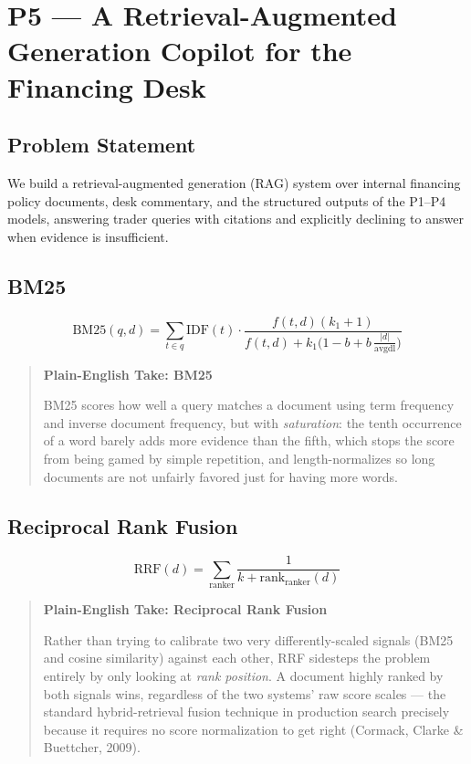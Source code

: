 \documentclass[11pt]{report}
\newenvironment{feynman}[1]{%
  \begin{quote}\small\color{black}
  \colorbox{feynman}{\parbox{0.97\linewidth}{\vspace{2pt}\textbf{\color{navy}Plain-English Take: #1}\\[2pt]
}}
}{\end{quote}}
\begin{document}
\chapter{P5 --- A Retrieval-Augmented Generation Copilot for the Financing Desk}

\section{Problem Statement}
We build a retrieval-augmented generation (RAG) system over internal financing policy documents, desk
commentary, and the structured outputs of the P1--P4 models, answering trader queries with citations
and explicitly declining to answer when evidence is insufficient.

\section{BM25}
\begin{equation}
\text{BM25}(q,d) = \sum_{t\in q} \text{IDF}(t)\cdot\frac{f(t,d)(k_1+1)}{f(t,d) + k_1\big(1-b+b\,\tfrac{|d|}{\text{avgdl}}\big)}
\end{equation}
\begin{feynman}{BM25}
BM25 scores how well a query matches a document using term frequency and inverse document frequency,
but with \emph{saturation}: the tenth occurrence of a word barely adds more evidence than the fifth,
which stops the score from being gamed by simple repetition, and length-normalizes so long documents
are not unfairly favored just for having more words.
\end{feynman}

\section{Reciprocal Rank Fusion}
\begin{equation}
\text{RRF}(d) = \sum_{\text{ranker}} \frac{1}{k + \text{rank}_{\text{ranker}}(d)}
\end{equation}
\begin{feynman}{Reciprocal Rank Fusion}
Rather than trying to calibrate two very differently-scaled signals (BM25 and cosine similarity)
against each other, RRF sidesteps the problem entirely by only looking at \emph{rank position}. A
document highly ranked by both signals wins, regardless of the two systems' raw score scales — the
standard hybrid-retrieval fusion technique in production search precisely because it requires no score
normalization to get right (Cormack, Clarke \& Buettcher, 2009).
\end{feynman}
\end{document}
